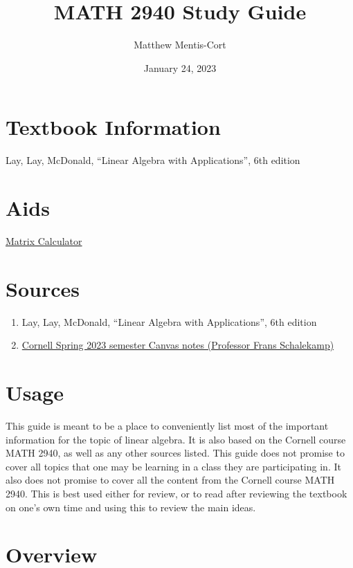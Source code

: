 \documentclass[a4paper,12pt]{article}
\title{MATH 2940 Study Guide}
\author{Matthew Mentis-Cort}
\date{January 24, 2023}
\theoremstyle{definition}
\theoremstyle{definition}
\begin{document}
	\maketitle
	
	\tableofcontents
	\newpage
	
	\section{Textbook Information}
	Lay, Lay, McDonald, “Linear Algebra with Applications”, 6th edition
	\section{Aids}
	\href{https://matrixcalc.org/}{Matrix Calculator}
	
	\section{Sources}
	\begin{enumerate}
		\item Lay, Lay, McDonald, “Linear Algebra with Applications”, 6th edition
		
		\item \href{https://canvas.cornell.edu/courses/48198}{Cornell Spring 2023 semester Canvas notes (Professor Frans Schalekamp)}
	\end{enumerate}
	
	\section{Usage}
	This guide is meant to be a place to conveniently list most of the important information for the topic of linear algebra. It is also based on the Cornell course MATH 2940, as well as any other sources listed. This guide does not promise to cover all topics that one may be learning in a class they are participating in. It also does not promise to cover all the content from the Cornell course MATH 2940. This is best used either for review, or to read after reviewing the textbook on one's own time and using this to review the main ideas.
	\newpage
	
	\section{Overview}
\end{document}
